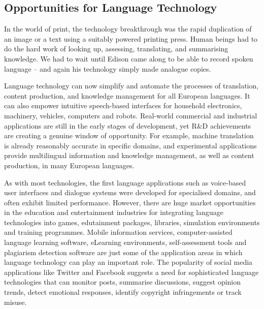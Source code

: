 \begin{multicols}{2}
\subsection{Opportunities for Language Technology}

In the world of print, the technology breakthrough was the rapid duplication of an image or a text using a suitably powered printing press. Human beings had to do the hard work of looking up, assessing, translating, and summarising knowledge. We had to wait until Edison came along to be able to record spoken language – and again his technology simply made analogue copies.

Language technology can now simplify and automate the processes of translation, content production, and knowledge management for all European languages. It can also empower intuitive speech-based interfaces for household electronics, machinery, vehicles, computers and robots. Real-world commercial and industrial applications are still in the early stages of development, yet R\&D achievements are creating a genuine window of opportunity. For example, machine translation is already reasonably accurate in specific domains, and experimental applications provide multilingual information and knowledge management, as well as content production, in many European languages. 

As with most technologies, the first language applications such as voice-based user interfaces and dialogue systems were developed for specialised domains, and often exhibit limited performance. However, there are huge market opportunities in the education and entertainment industries for integrating language technologies into games, edutainment packages, libraries, simulation environments and training programmes. Mobile information services, computer-assisted language learning software, eLearning environments, self-assessment tools and plagiarism detection software are just some of the application areas in which language technology can play an important role. The popularity of social media applications like Twitter and Facebook suggests a need for sophisticated language technologies that can monitor posts, summarise discussions, suggest opinion trends, detect emotional responses, identify copyright infringements or track misuse.



\end{multicols}
